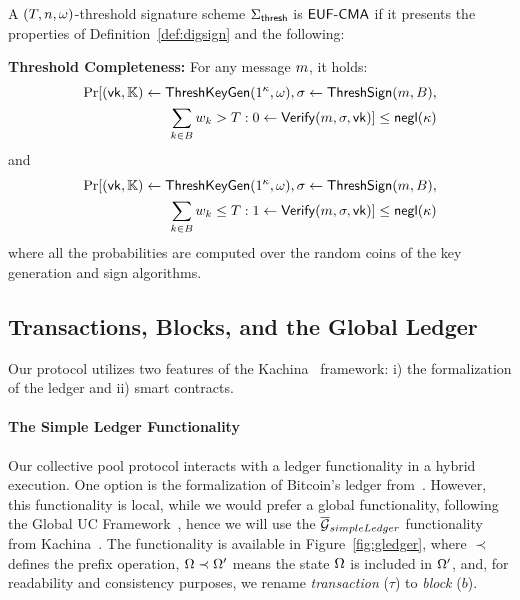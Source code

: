 \begin{definition}
    A $(T, n, \omega)$-threshold signature scheme
    $\Sigma_{\mathsf{thresh}}$ is $\textsf{EUF-CMA}$ if it presents the properties of
    Definition~\ref{def:digsign} and the following:

    {\bf Threshold Completeness:} For any message $m$, it holds:
    \begin{align}
        \Pr[(\mathsf{vk}, \mathbb{K}) \leftarrow \mathsf{ThreshKeyGen}(1^\kappa, \omega), \sigma \leftarrow \mathsf{ThreshSign}(m, B),  \nonumber \\
        \sum_{k \in B} w_k > T: 0 \leftarrow \mathsf{Verify}(m, \sigma, \mathsf{vk})]
        \leq \mathsf{negl}(\kappa) \nonumber
    \end{align}
    and
    \begin{align}
        \Pr[(\mathsf{vk}, \mathbb{K}) \leftarrow \mathsf{ThreshKeyGen}(1^\kappa, \omega), \sigma \leftarrow \mathsf{ThreshSign}(m, B),  \nonumber \\
        \sum_{k \in B} w_k \leq T: 1 \leftarrow \mathsf{Verify}(m, \sigma, \mathsf{vk})]
        \leq \mathsf{negl}(\kappa) \nonumber
    \end{align}
    where all the probabilities are computed over the random coins of the
    key generation and sign algorithms.
\end{definition}

\subsection{Transactions, Blocks, and the Global Ledger}\label{sec:global-ledger}
Our protocol utilizes two features of the Kachina~\cite{kachina} framework: i)
the formalization of the ledger and ii) smart contracts.

\paragraph{The Simple Ledger Functionality}
Our collective pool protocol interacts with a ledger functionality in a hybrid
execution.  One option is the formalization of Bitcoin's ledger from~\cite{C:BMTZ17}.
However, this functionality is local, while we would prefer a global
functionality, following the Global UC Framework~\cite{TCC:CDPW07}, hence we
will use the ${\overline{\mathcal{G}}}_{simpleLedger}$ functionality from Kachina~\cite{kachina}. The
functionality is available in Figure~\ref{fig:gledger}, where $\prec$ defines
the prefix operation, \ie $\Omega\prec\Omega^\prime$ means the
state $\Omega$ is included in $\Omega^\prime$, and, for
readability and consistency purposes, we rename \emph{transaction} ($\tau$) to
\emph{block} ($b$).

